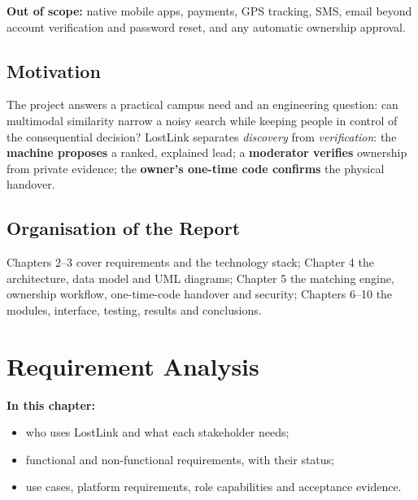 \documentclass[12pt,a4paper,oneside]{report}
\begin{document}
\textbf{Out of scope:} native mobile apps, payments, GPS tracking, SMS, email beyond account verification and password reset, and any automatic ownership approval.

\section{Motivation}
The project answers a practical campus need and an engineering question: can multimodal similarity narrow a noisy search while keeping people in control of the consequential decision? LostLink separates \emph{discovery} from \emph{verification}: the \textbf{machine proposes} a ranked, explained lead; a \textbf{moderator verifies} ownership from private evidence; the \textbf{owner's one-time code confirms} the physical handover.

\section{Organisation of the Report}
Chapters 2--3 cover requirements and the technology stack; Chapter 4 the architecture, data model and UML diagrams; Chapter 5 the matching engine, ownership workflow, one-time-code handover and security; Chapters 6--10 the modules, interface, testing, results and conclusions.

\chapter{Requirement Analysis}
\textbf{In this chapter:}
\begin{itemize}[beginpenalty=10000]
  \item who uses LostLink and what each stakeholder needs;
  \item functional and non-functional requirements, with their status;
  \item use cases, platform requirements, role capabilities and acceptance evidence.
\end{itemize}
\end{document}

